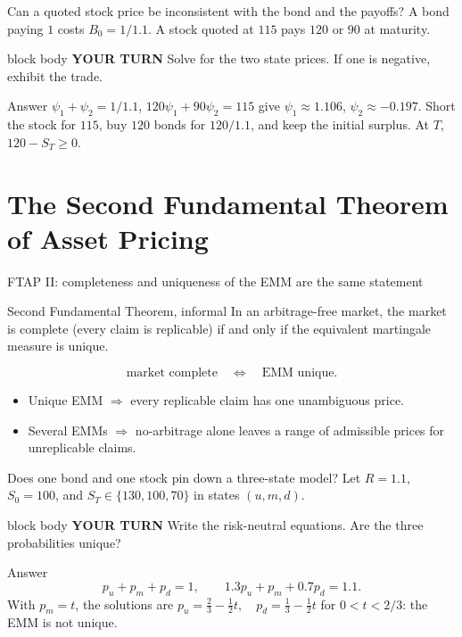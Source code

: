 \documentclass[handout,10pt,aspectratio=169]{beamer}
\newenvironment{pausebox}{\begin{beamercolorbox}[rounded=true,sep=0.8em,wd=\textwidth]{block body}
  \textbf{\color{CourseGold}YOUR TURN}\quad}{\end{beamercolorbox}}
\newcommand{\1}{\mathbf 1}
\begin{document}
\begin{frame}{Can a quoted stock price be inconsistent with the bond and the payoffs?}
A bond paying \(1\) costs \(B_0=1/1.1\). A stock quoted at \(115\) pays
\(120\) or \(90\) at maturity.
\begin{pausebox}
Solve for the two state prices. If one is negative, exhibit the trade.
\end{pausebox}

\begin{exampleblock}{Answer}
\(\psi_1+\psi_2=1/1.1\), \(120\psi_1+90\psi_2=115\) give
\(\psi_1\approx1.106\), \(\psi_2\approx-0.197\).
Short the stock for \(115\), buy \(120\) bonds for \(120/1.1\), and keep the
initial surplus. At \(T\), \(120-S_T\geq0\).
\end{exampleblock}
\end{frame}



\section{The Second Fundamental Theorem of Asset Pricing}

\begin{frame}{FTAP II: completeness and uniqueness of the EMM are the same statement}
\begin{block}{Second Fundamental Theorem, informal}
In an arbitrage-free market, the market is complete (every claim is
replicable) if and only if the equivalent martingale measure is unique.
\end{block}
\[
\boxed{
\text{market complete}
\quad\Longleftrightarrow\quad
\text{EMM unique}.}
\]
\begin{itemize}
  \item Unique EMM \(\Longrightarrow\) every replicable claim has one
        unambiguous price.
  \item Several EMMs \(\Longrightarrow\) no-arbitrage alone leaves a range of
        admissible prices for unreplicable claims.
\end{itemize}
\end{frame}

\begin{frame}{Does one bond and one stock pin down a three-state model?}
Let \(R=1.1\), \(S_0=100\), and \(S_T\in\{130,100,70\}\) in states
\((u,m,d)\).
\begin{pausebox}
Write the risk-neutral equations. Are the three probabilities unique?
\end{pausebox}

\begin{exampleblock}{Answer}
\[
p_u+p_m+p_d=1,
\qquad 1.3p_u+p_m+0.7p_d=1.1.
\]
With \(p_m=t\), the solutions are
\(\boxed{p_u=\tfrac23-\tfrac12t,\quad p_d=\tfrac13-\tfrac12t}\)
for \(0<t<2/3\): the EMM is not unique.
\end{exampleblock}
\end{frame}
\end{document}

